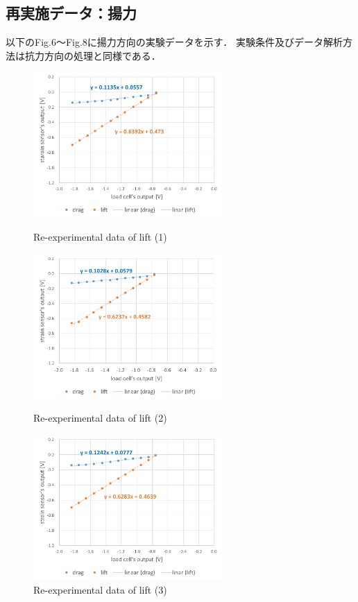 \documentclass[twocolumn,a4j]{jsarticle}
\begin{document}
\newpage

\subsection{再実施データ：揚力}
以下のFig.6～Fig.8に揚力方向の実験データを示す．
実験条件及びデータ解析方法は抗力方向の処理と同様である．
\begin{figure}[htbp]
    \footnotesize
    \begin{center}
        \includegraphics[width=72mm]{../images/graph_21119_lift_1.png}
        \caption{Re-experimental data of lift (1)}
        \includegraphics[width=72mm]{../images/graph_21119_lift_2.png}
        \caption{Re-experimental data of lift (2)}
        \includegraphics[width=72mm]{../images/graph_21119_lift_3.png}
        \caption{Re-experimental data of lift (3)}
    \end{center}
\end{figure}
\end{document}
